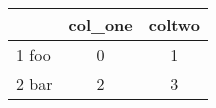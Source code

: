 \begin{tabular}{lcc}
\toprule
 & col\_one & coltwo \\
\midrule
1 foo & 0 & 1 \\
2 bar & 2 & 3 \\
\bottomrule
\end{tabular}
